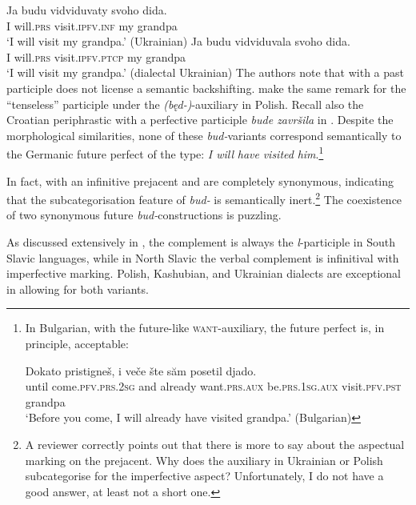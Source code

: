 \documentclass[output=paper,colorlinks,citecolor=brown]{langscibook}
\begin{document}
\ea
\ea\label{bud-i}\gll Ja budu vidviduvaty svoho dida.\\
I will.\textsc{prs} visit.\textsc{ipfv}.\textsc{inf} my grandpa \\
\glt
`I will visit my grandpa.' \hfill (Ukrainian)
\ex\label{bud-l}\gll 
Ja budu vidviduvala svoho dida.\\
I will.\textsc{prs} visit.\textsc{ipfv}.\textsc{ptcp} my grandpa \\
\glt
`I will visit my grandpa.' \hfill (dialectal Ukrainian)
\z\z
The authors note that  with a past participle does not license a semantic backshifting. \citet[13]{blaszczak14} make the same remark for the ``tenseless'' participle under the {\textit{(b{ę}d-)}}-auxiliary in Polish. Recall also the Croatian periphrastic with a perfective participle \textit{bude završila} in .  Despite the  morphological similarities, none of these \textit{bud-}variants  correspond semantically to the Germanic future perfect of the type: {\textit{I will}} \textit{have} \textit{visited} \textit{him}.\footnote{In Bulgarian, with the future-like \textsc{want}-auxiliary, the future perfect is, in principle, acceptable: 

\ea\label{futperf}\gll
Dokato pristigneš, i ve{č}e šte săm posetil djado. \\
until come.\textsc{pfv}.\textsc{prs.2sg} and already want.\textsc{prs}.\textsc{aux} be.\textsc{prs.1sg}.\textsc{aux} visit.\textsc{pfv}.\textsc{pst} grandpa\\
\glt `Before you come, I will already have visited grandpa.' \hfill (Bulgarian)
\z}

In fact,  with an infinitive prejacent and  are completely synonymous, indicating that the subcategorisation feature of \textit{bud-} is semantically inert.\footnote{A reviewer correctly points out that there is more to say about the aspectual marking on the prejacent. Why does the auxiliary in Ukrainian or Polish subcategorise for the imperfective aspect? Unfortunately, I do not have a good answer, at least not a short one.} 
The coexistence of two synonymous future {\textit{bud-}}constructions is puzzling.

As discussed extensively in \citet{whaley00}, the 
complement is always the {\textit{l}}-participle  in South Slavic languages, while in North Slavic  the verbal complement is infinitival with imperfective marking. Polish, Kashubian, and Ukrainian dialects are exceptional in allowing for both variants.
\end{document}
